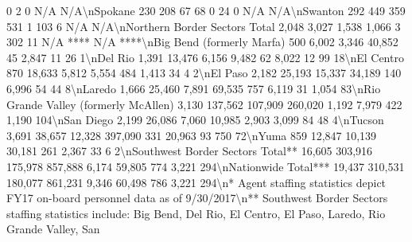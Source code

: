 \documentclass[
]{krantz}
\makeatletter
\newenvironment{Shaded}{\begin{snugshade}}{\end{snugshade}}
\newenvironment{kframe}{%
\medskip{}
\setlength{\fboxsep}{.8em}
 \def\at@end@of@kframe{}%
 \ifinner\ifhmode%
  \def\at@end@of@kframe{\end{minipage}}%
  \begin{minipage}{\columnwidth}%
 \fi\fi%
 \def\FrameCommand##1{\hskip\@totalleftmargin \hskip-\fboxsep
 \colorbox{shadecolor}{##1}\hskip-\fboxsep
     \hskip-\linewidth \hskip-\@totalleftmargin \hskip\columnwidth}%
 \MakeFramed {\advance\hsize-\width
   \@totalleftmargin\z@ \linewidth\hsize
   \@setminipage}}%
 {\par\unskip\endMakeFramed%
 \at@end@of@kframe}
\renewenvironment{Shaded}{\begin{kframe}}{\end{kframe}}
\makeatother
\begin{document}
\begin{Shaded}
\begin{Highlighting}[]
       0                2               0              N/A      N/A\textbackslash{}nSpokane                                           230                208                       67                     68                 0               24               0              N/A      N/A\textbackslash{}nSwanton                                           292               449                       359                    531                 1               103               6             N/A      N/A\textbackslash{}nNorthern Border Sectors Total                    2,048             3,027                     1,538                  1,066                3               302              11        N/A ****    N/A   ****\textbackslash{}nBig Bend (formerly Marfa)                         500              6,002                     3,346                  40,852              45              2,847             11             26       1\textbackslash{}nDel Rio                                          1,391             13,476                    6,156                  9,482               62              8,022             12             99       18\textbackslash{}nEl Centro                                         870              18,633                    5,812                  5,554              484              1,413             34             4        2\textbackslash{}nEl Paso                                          2,182             25,193                   15,337                  34,189             140              6,996             54             44       8\textbackslash{}nLaredo                                           1,666             25,460                    7,891                  69,535             757              6,119             31            1,054     83\textbackslash{}nRio Grande Valley (formerly McAllen)             3,130            137,562                  107,909                 260,020            1,192             7,979            422            1,190    104\textbackslash{}nSan Diego                                        2,199             26,086                    7,060                  10,985            2,903             3,099             84             48       4\textbackslash{}nTucson                                           3,691             38,657                   12,328                 397,090             331             20,963             93            750       72\textbackslash{}nYuma                                              859              12,847                   10,139                  30,181             261              2,367             33             6        2\textbackslash{}nSouthwest Border Sectors Total**                16,605            303,916                  175,978                 857,888            6,174            59,805            774            3,221    294\textbackslash{}nNationwide Total***                             19,437            310,531                  180,077                 861,231            9,346            60,498            786            3,221    294\textbackslash{}n* Agent staffing statistics depict FY17 on{-}board personnel data as of 9/30/2017\textbackslash{}n** Southwest Border Sectors staffing statistics include: Big Bend, Del Rio, El Centro, El Paso, Laredo, Rio Grande Valley, San 
\end{Highlighting}
\end{Shaded}
\end{document}
